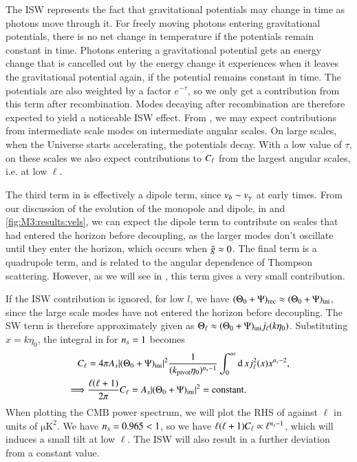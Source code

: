 The ISW represents the fact that gravitational potentials may change in time as photons move through it. For freely moving photons entering gravitational potentials, there is no net change in temperature if the potentials remain constant in time. Photons entering a gravitational potential gets an energy change that is cancelled out by the energy change it experiences when it leaves the gravitational potential again, if the potential remains constant in time. The potentials are also weighted by a factor $e^{-\tau}$, so we only get a contribution from this term after recombination. Modes decaying after recombination are therefore expected to yield a noticeable ISW effect. From , we may expect contributions from intermediate scale modes on intermediate angular scales. On large scales, when the Universe starts accelerating, the potentials decay. With a low value of $\tau$, on these scales we also expect contributions to $C_\ell$ from the largest angular scales, i.e. at low $\ell$.  

The third term in  is effectively a dipole term, since $v_b\sim v_\gamma$ at early times. From our discussion of the evolution of the monopole and dipole, in  and \ref{fig:M3:results:vels}, we can expect the dipole term to contribute on scales that had entered the horizon before decoupling, as the larger modes don't oscillate until they enter the horizon, which occurs when $\tilde{g}\approx0$. The final term is a quadrupole term, and is related to the angular dependence of Thompson scattering. However, as we will see in , this term gives a very small contribution.

If the ISW contribution is ignored, for low $l$, we have $(\Theta_0 + \Psi)_\mathrm{rec}\approx(\Theta_0 + \Psi)_\mathrm{ini}$, since the large scale modes have not entered the horizon before decoupling. The SW term is therefore approximately given as $\Theta_\ell\approx (\Theta_0 + \Psi)_\mathrm{ini} j_\ell(k\eta_0)$. Substituting $x=k\eta_0$, the integral in  for $n_s=1$ becomes 
\begin{equation} \label{eq:M4:theory:C_ell_SW_plateau_integral}
    \begin{split}
        C_\ell &= 4\pi A_s \abs{(\Theta_0+\Psi)_\mathrm{ini}}^2 \frac{1}{(k_\mathrm{pivot} \eta_0)^{n_s-1}} \int_0^\infty \dd\, x j_\ell^2(x) x^{n_s-2}, \\
        \implies& \frac{\ell(\ell+1)}{2\pi}C_\ell = A_s \abs{(\Theta_0+\Psi)_\mathrm{ini}}^2 = \text{constant}.   
    \end{split}
\end{equation}
When plotting the CMB power spectrum, we will plot the RHS of  against $\ell$ in units of $\mathrm{\mu K^2}$. We have $n_s=0.965<1$, so we have $\ell(\ell+1)C_\ell\propto \ell^{n_s-1}$, which will induces a small tilt at low $\ell$. The ISW will also result in a further deviation from a constant value. 


